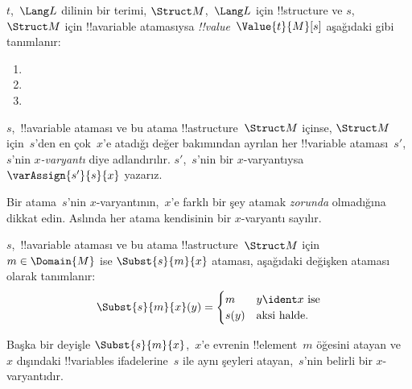 \begin{defn}
$t$,~$\Lang L$ dilinin bir terimi, $\Struct M$,~$\Lang L$ için
!!{structure} ve $s$,~$\Struct M$ için !!a{variable} atamasıysa
\emph{!!{value}}~$\Value{t}{M}[s]$ aşağıdaki gibi tanımlanır:
\begin{enumerate}
\item {}
\item {}
\item {}
\end{enumerate}
\end{defn}

\begin{defn}[$x$-Varyantı]
$s$,~!!a{variable} ataması ve bu atama !!a{structure}~$\Struct M$
içinse,
$\Struct M$ için~$s$'den en çok~$x$'e atadığı değer bakımından ayrılan
her !!{variable} ataması~$s'$,~$s$'nin \emph{$x$-varyantı} diye
adlandırılır. $s'$,~$s$'nin bir $x$-varyantıysa
$\varAssign{s'}{s}{x}$ yazarız.
\end{defn}

\begin{explain}
Bir atama~$s$'nin $x$-varyantının,~$x$'e farklı bir şey atamak
\emph{zorunda} olmadığına dikkat edin. Aslında her atama kendisinin
bir $x$-varyantı sayılır.
\end{explain}

\begin{defn}
  $s$,~!!a{variable} ataması ve bu atama !!a{structure}~$\Struct M$ için
  $m \in \Domain{M}$ ise $\Subst{s}{m}{x}$ ataması, aşağıdaki değişken
  ataması olarak tanımlanır:
  \[\Subst{s}{m}{x}(y) = \begin{cases}
    m & \text{$y \ident x$ ise}\\
    s(y) & \text{aksi halde}.
  \end{cases}\]
\end{defn}

Başka bir deyişle $\Subst{s}{m}{x}$,~$x$'e evrenin
!!{element}~$m$ öğesini atayan ve~$x$ dışındaki !!{variable}s
ifadelerine~$s$ ile aynı şeyleri atayan,~$s$'nin belirli bir
$x$-varyantıdır.

